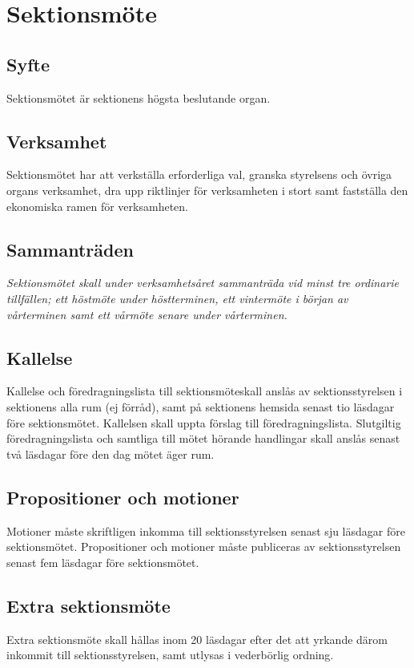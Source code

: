\documentclass{datateknologsektionen-document}
\begin{document}
  \section{Sektionsmöte}
    \subsection{Syfte}
      Sektionsmötet är sektionens högsta beslutande organ.
    \subsection{Verksamhet}
      Sektionsmötet har att verkställa erforderliga val, granska styrelsens och övriga organs
      verksamhet, dra upp riktlinjer för verksamheten i stort samt fastställa den ekonomiska
      ramen för verksamheten.
    \subsection{Sammanträden}
      \textit{Sektionsmötet skall under verksamhetsåret sammanträda vid minst tre ordinarie tillfällen;
      ett höstmöte under höstterminen, ett vintermöte i början av vårterminen samt ett vårmöte
      senare under vårterminen.
      }
    \subsection{Kallelse}
      Kallelse och föredragningslista till sektionsmöteskall anslås av sektionsstyrelsen i
      sektionens alla rum (ej förråd), samt på sektionens hemsida senast tio läsdagar före
      sektionsmötet. Kallelsen skall uppta förslag till föredragningslista. Slutgiltig
      föredragningslista och samtliga till mötet hörande handlingar skall anslås senast två
      läsdagar före den dag mötet äger rum.
    \subsection{Propositioner och motioner}
      Motioner måste skriftligen inkomma till sektionsstyrelsen senast sju läsdagar före sektionsmötet. Propositioner och motioner måste publiceras av sektionsstyrelsen senast fem läsdagar före sektionsmötet.
    \subsection{Extra sektionsmöte}
      Extra sektionsmöte skall hållas inom 20 läsdagar efter det att yrkande därom inkommit
      till sektionsstyrelsen, samt utlysas i vederbörlig ordning.
\end{document}
